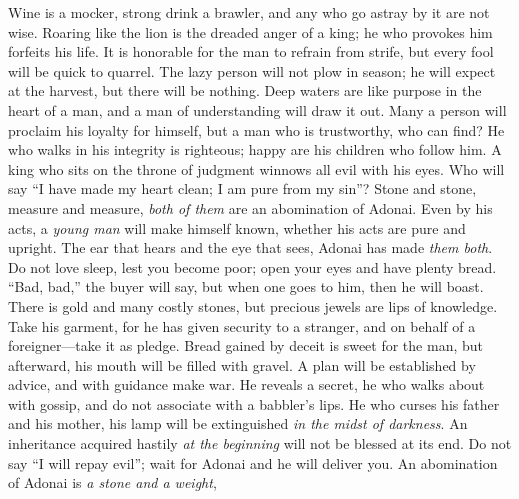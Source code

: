\begin{biblechapter} %
\verse Wine is a mocker, strong drink a brawler, 
and any who go astray by it are not wise.
\verse Roaring like the lion is the dreaded anger of a king; 
he who provokes him forfeits his life.
\verse It is honorable for the man to refrain from strife, 
but every fool will be quick to quarrel.
\verse The lazy person will not plow in season; 
he will expect at the harvest, but there will be nothing.
\verse Deep waters are like purpose in the heart of a man, 
and a man of understanding will draw it out.
\verse Many a person will proclaim his loyalty for himself, 
but a man who is trustworthy, who can find?
\verse He who walks in his integrity is righteous; 
happy are his children who follow him.
\verse A king who sits on the throne of judgment 
winnows all evil with his eyes.
\verse Who will say “I have made my heart clean; 
I am pure from my sin”?
\verse Stone and stone, measure and measure, 
\textit{both of them} are an abomination of Adonai.
\verse Even by his acts, a \textit{young man} will make himself known, 
whether his acts are pure and upright.
\verse The ear that hears and the eye that sees, 
Adonai has made \textit{them both}.
\verse Do not love sleep, lest you become poor; 
open your eyes and have plenty bread.
\verse “Bad, bad,” the buyer will say, 
but when one goes to him, then he will boast.
\verse There is gold and many costly stones, 
but precious jewels are lips of knowledge.
\verse Take his garment, for he has given security to a stranger, 
and on behalf of a foreigner—take it as pledge.
\verse Bread gained by deceit is sweet for the man, 
but afterward, his mouth will be filled with gravel.
\verse A plan will be established by advice, 
and with guidance make war.
\verse He reveals a secret, he who walks about with gossip, 
and do not associate with a babbler’s lips.
\verse He who curses his father and his mother, 
his lamp will be extinguished \textit{in the midst of darkness}.
\verse An inheritance acquired hastily \textit{at the beginning} 
will not be blessed at its end.
\verse Do not say “I will repay evil”; 
wait for Adonai and he will deliver you.
\verse An abomination of Adonai is \textit{a stone and a weight}, 

\end{biblechapter}
